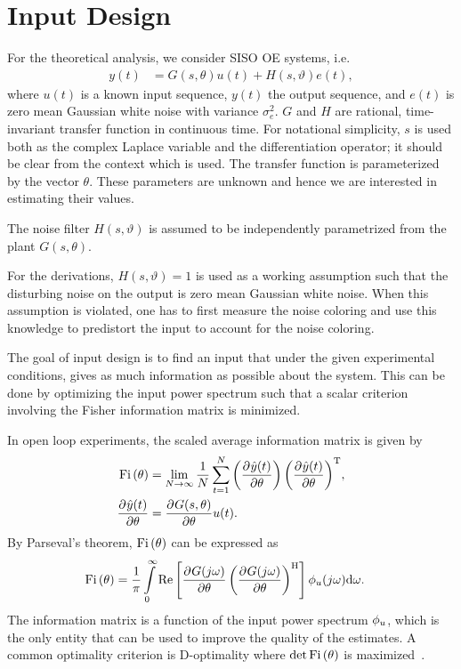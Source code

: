 \section{Input Design}
\label{sec:excitation:inputDesign}
For the theoretical analysis, we consider \gls{SISO} \gls{OE} systems, i.e.
\begin{align}
y(t) &=G(s,\theta)u(t)  + H(s,\vartheta)e(t),
\end{align}
where $u(t)$ is a known input sequence, $y(t)$ the output sequence, and $e(t)$ is zero mean Gaussian white noise with variance $\sigma_{e}^2$.
$G$ and $H$ are rational, time-invariant transfer function in continuous time.
For notational simplicity, $s$ is used both as the complex Laplace variable and the differentiation operator; it should be clear from the context which is used. 
The transfer function is parameterized by the vector $\theta$.
These parameters are unknown and hence we are interested in estimating their values.
\begin{assumption}
The noise filter $H(s,\vartheta)$ is assumed to be independently parametrized from the plant $G(s,\theta)$.
\end{assumption}
\begin{assumption}
For the derivations, $H(s,\vartheta) = 1$ is used as a working assumption such that the disturbing noise on the output is zero mean Gaussian white noise.
When this assumption is violated, one has to first measure the noise coloring and use this knowledge to predistort the input to account for the noise coloring.
\end{assumption}

The goal of input design is to find an input that under the given experimental conditions, gives as much information as possible about the system.
This can be done by optimizing the input power spectrum such that  a scalar criterion involving the Fisher information matrix is minimized.

In open loop experiments, the scaled average information matrix is given by
\begin{align}
\mathrm{Fi} \left(\theta\right) & = \lim_{N\rightarrow\infty}
          \frac{1}{N}
            \sum_{t=1}^{N}
              {\left(\frac{{\partial}^{} \hat{y}(t)}{\partial \theta}\right)
               \left(\frac{{\partial}^{} \hat{y}(t)}{\partial \theta}\right)^{\mathrm{T}}},\\
\frac{{\partial}^{} \hat{y}(t)}{\partial \theta}
    & =\frac{{\partial}^{} G(s,\theta)}{\partial \theta}u(t).
\end{align}
By Parseval's theorem, $\mathrm{Fi} \left(\theta\right)$ can be expressed as
\begin{align}
\mathrm{Fi} \left(\theta\right) &= \frac{1}{\pi}
         \int\limits_0^\infty
        \operatorname{\mathrm{Re}} \left[
                  \frac{{\partial}^{} G(j\omega)}{\partial \theta}
                  \left(\frac{{\partial}^{} G(j\omega)}{\partial \theta}\right)^{\mathrm{H}}
         \right]
           \phi_{u}(j\omega)
           \mathrm{d}{\omega} \text{.}
\label{eq:excitation:IF}
\end{align}
The information matrix is a function of the input power spectrum $\phi_{u}$, which is the only entity that can be used to improve the quality of the estimates. 
A common optimality criterion is D-optimality where $\det{\ensuremath{\mathrm{Fi} \left(\theta\right)}}$ is maximized~\citep{Goodwin1977}.

